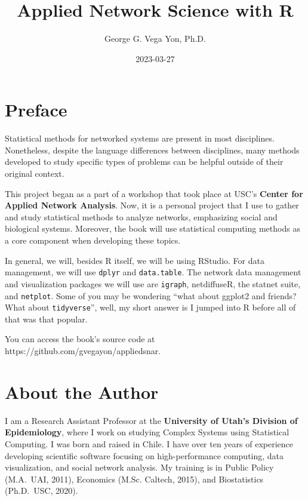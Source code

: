 \documentclass[
]{book}
\title{Applied Network Science with R}
\author{George G. Vega Yon, Ph.D.}
\date{2023-03-27}
\begin{document}
\maketitle

{
\setcounter{tocdepth}{1}
\tableofcontents
}
\hypertarget{preface}{%
\chapter{Preface}\label{preface}}

\renewcommand{\Pr}[1]{\mbox{Pr}\left(#1\right)}
\renewcommand{\exp}[1]{\mbox{exp}\left\{#1\right\}}

Statistical methods for networked systems are present in most disciplines. Nonetheless, despite the language differences between disciplines, many methods developed to study specific types of problems can be helpful outside of their original context.

This project began as a part of a workshop that took place at USC's \textbf{Center for Applied Network Analysis}. Now, it is a personal project that I use to gather and study statistical methods to analyze networks, emphasizing social and biological systems. Moreover, the book will use statistical computing methods as a core component when developing these topics.

In general, we will, besides R itself, we will be using RStudio. For data management, we will use \texttt{dplyr} and \texttt{data.table}. The network data management and visualization packages we will use are \texttt{igraph}, netdiffuseR, the statnet suite, and \texttt{netplot}. Some of you may be wondering ``what about ggplot2 and friends? What about \texttt{tidyverse}'', well, my short answer is I jumped into R before all of that was that popular.

You can access the book's source code at https://github.com/gvegayon/appliedsnar.

\hypertarget{about-the-author}{%
\chapter{About the Author}\label{about-the-author}}

I am a Research Assistant Professor at the \textbf{University of Utah's Division of Epidemiology}, where I work on studying Complex Systems using Statistical Computing. I was born and raised in Chile. I have over ten years of experience developing scientific software focusing on high-performance computing, data visualization, and social network analysis. My training is in Public Policy (M.A.~UAI, 2011), Economics (M.Sc. Caltech, 2015), and Biostatistics (Ph.D.~USC, 2020).
\end{document}
